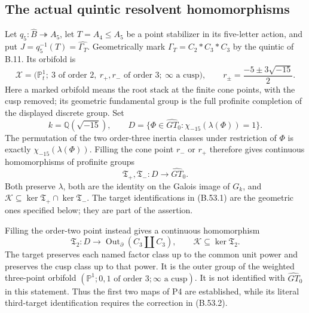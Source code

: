 \subsection*{The actual quintic resolvent homomorphisms}

Let $q_5:\widehat B\twoheadrightarrow A_5$, let
$T=A_4\leq A_5$ be a point stabilizer in its five-letter action,
and put $J=q_5^{-1}(T)=\widehat{\Gamma_T}$. Geometrically mark
$\Gamma_T=C_2*C_3*C_3$ by the quintic of B.11. Its orbifold is
\[
 \mathscr X=\bigl(\mathbb P^1_t;\ 3\text{ of order }2,
       \ r_+,r_-\text{ of order }3;\ \infty\text{ a cusp}\bigr),
 \qquad r_\pm=\frac{-5\pm3\sqrt{-15}}2.
\]
Here a marked orbifold means the root stack at the finite cone
points, with the cusp removed; its geometric fundamental group
is the full profinite completion of the displayed discrete group.
Set
\[
 k=\mathbb Q(\sqrt{-15}),\qquad
 D=\{\Phi\in\widehat{GT}_0:
                  \chi_{-15}(\lambda(\Phi))=1\}.
\]
The permutation of the two order-three inertia classes under
restriction of $\Phi$ is exactly $\chi_{-15}(\lambda(\Phi))$.
Filling the cone point $r_-$ or $r_+$ therefore gives continuous
homomorphisms of profinite groups
\[
             \mathfrak T_+,\mathfrak T_-:
                         D\longrightarrow\widehat{GT}_0.
                                                               \tag{B.53.1}
\]
Both preserve $\lambda$, both are the identity on the Galois
image of $G_k$, and
$\mathcal K\subseteq\ker\mathfrak T_+\cap\ker\mathfrak T_-$.
The target identifications in (B.53.1) are the geometric ones
specified below; they are part of the assertion.

Filling the order-two point instead gives a continuous homomorphism
\[
 \mathfrak T_2:D\longrightarrow
  \operatorname{Out}_{\partial}(C_3\amalg C_3),
                    \qquad \mathcal K\subseteq\ker\mathfrak T_2.
                                                               \tag{B.53.2}
\]
The target preserves each named factor class up to the common
unit power and preserves the cusp class up to that power.
It is the outer group of the weighted three-point orbifold
$(\mathbb P^1;0,1\text{ of order }3;\infty\text{ a cusp})$.
It is not identified with $\widehat{GT}_0$ in this statement.
Thus the first two maps of P4 are established, while its literal
third-target identification requires the correction in (B.53.2).

